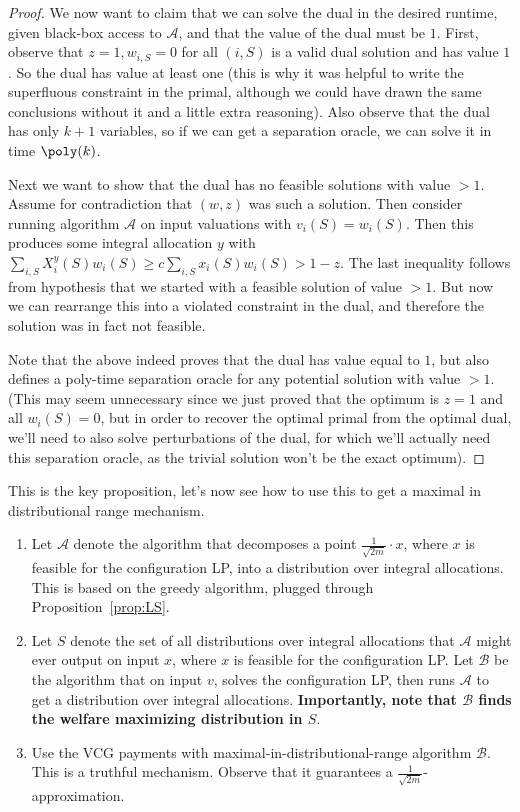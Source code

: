 \begin{proof}
We now want to claim that we can solve the dual in the desired runtime, given black-box access to $\mathcal{A}$, and that the value of the dual must be $1$. First, observe that $z = 1, w_{i,S} = 0$ for all $(i,S)$ is a valid dual solution and has value $1$. So the dual has value at least one (this is why it was helpful to write the superfluous constraint in the primal, although we could have drawn the same conclusions without it and a little extra reasoning). Also observe that the dual has only $k+1$ variables, so if we can get a separation oracle, we can solve it in time $\poly(k)$. 

Next we want to show that the dual has no feasible solutions with value $> 1$. Assume for contradiction that $(w, z)$ was such a solution. Then consider running algorithm $\mathcal{A}$ on input valuations with $v_i(S) = w_i(S)$. Then this produces some integral allocation $y$ with $\sum_{i, S} X^y_{i}(S) w_{i}(S) \geq c\sum_{i, S} x_{i}(S) w_{i}(S) > 1-z$. The last inequality follows from hypothesis that we started with a feasible solution of value $> 1$. But now we can rearrange this into a violated constraint in the dual, and therefore the solution was in fact not feasible. 

Note that the above indeed proves that the dual has value equal to $1$, but also defines a poly-time separation oracle for any potential solution with value $>1$. (This may seem unnecessary since we just proved that the optimum is $z =1$ and all $w_i(S) = 0$, but in order to recover the optimal primal from the optimal dual, we'll need to also solve perturbations of the dual, for which we'll actually need this separation oracle, as the trivial solution won't be the exact optimum). 
\end{proof}

This is the key proposition, let's now see how to use this to get a maximal in distributional range mechanism. 
\begin{enumerate}
\item Let $\mathcal{A}$ denote the algorithm that decomposes a point $\frac{1}{\sqrt{2m}}\cdot x$, where $x$ is feasible for the configuration LP, into a distribution over integral allocations. This is based on the greedy algorithm, plugged through Proposition~\ref{prop:LS}.
\item Let $S$ denote the set of all distributions over integral allocations that $\mathcal{A}$ might ever output on input $x$, where $x$ is feasible for the configuration LP. Let $\mathcal{B}$ be the algorithm that on input $v$, solves the configuration LP, then runs $\mathcal{A}$ to get a distribution over integral allocations. \textbf{Importantly, note that $\mathcal{B}$ finds the welfare maximizing distribution in $S$}.
\item Use the VCG payments with maximal-in-distributional-range algorithm $\mathcal{B}$. This is a truthful mechanism. Observe that it guarantees a $\frac{1}{\sqrt{2m}}$-approximation.
\end{enumerate}

